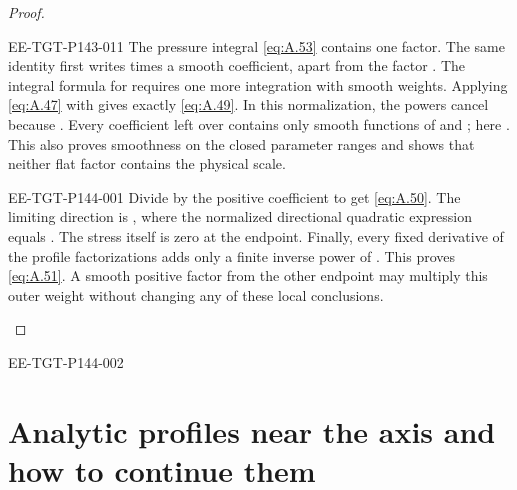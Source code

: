 \begin{proof}
\begin{EESegment}{EE-TGT-P143-011}
The pressure integral \eqref{eq:A.53} contains one  factor. The same identity first writes
 times a smooth coefficient, apart from the factor
. The integral formula for  requires one more integration with
smooth weights. Applying \eqref{eq:A.47} with  gives exactly \eqref{eq:A.49}. In this
normalization, the powers cancel because
. Every coefficient left over contains only smooth
functions of  and ; here
. This also proves smoothness on the closed parameter ranges and shows that neither
flat factor contains the physical scale.
\end{EESegment}

%
\begin{EESegment}{EE-TGT-P144-001}
Divide by the positive coefficient  to get \eqref{eq:A.50}. The limiting direction is
, where the normalized directional quadratic expression equals
. The stress itself is zero at the endpoint. Finally, every fixed derivative of the profile
factorizations adds only a finite inverse power of . This proves \eqref{eq:A.51}. A smooth
positive factor from the other endpoint may multiply this outer weight without changing any of these local conclusions.
\end{EESegment}
\end{proof}

\begin{EESegment}{EE-TGT-P144-002}
\section{Analytic profiles near the axis and how to continue them}\label{sec:B}
\end{EESegment}

